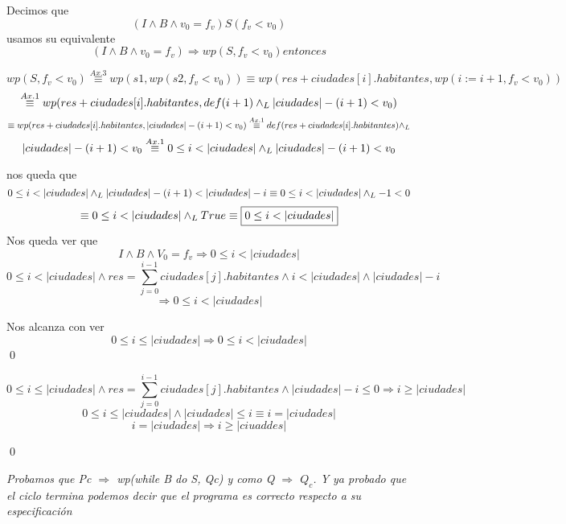 \documentclass[10pt,a4paper]{article}
\begin{document}
\begin{demoPc}
\begin{demo3}
			
			
		\end{demo3}
		
		
		
		
		\begin{demo4}
			Decimos que
			\[
			(I \land B \land v_{0}=f_{v}) S (f_{v}< v_{0})\]  usamos su equivalente \[(I \land B \land v_{0}=f_{v}) \Longrightarrow wp(S,f_{v} < v_{0}) entonces\]
			
			\[wp(S,f_{v}<v_{0}) \overset{Ax. 3}{\equiv} wp(s1,wp(s2,f_{v}<v_{0})) \equiv wp(res+ciudades[i].habitantes,wp(i:=i+1,f_{v} < v_{0})) \]
			\[\overset{Ax. 1}{\equiv} wp(res+ciudades[i].habitantes,def(i+1)\land _L |ciudades|-(i+1) < v_{0}) \]
			\[\equiv wp(res+ciudades[i].habitantes,|ciudades|-(i+1)< v_{0}) \overset{Ax. 1}{\equiv} def(res+ciudades[i].habitantes) \land _L\]
			\[|ciudades| -(i+1) < v_{0} \overset{Ax. 1}{\equiv} 0 \leq i<|ciudades| \yLuego |ciudades|-(i+1)< v_{0} \]
			
			\noindent  %
			nos queda que
			\[0 \leq i <|ciudades| \yLuego |ciudades|-(i+1) < |ciudades| - i \equiv 0 \leq i <|ciudades| \yLuego -1 < 0 \]
			\[\equiv 0 \leq i <|ciudades| \yLuego True \equiv \boxed{0 \leq i <|ciudades|}\]
			Nos queda ver que
			\[I \land B \land V_{0}=f_{v} \Longrightarrow 0 \leq i <|ciudades|\]
			\[ 0 \leq i < |ciudades| \land res= \sum_{j=0}^{i-1} ciudades[j].habitantes \land i < \lvert ciudades \rvert \land \lvert ciudades \rvert - i\]
			\[\Longrightarrow  0 \leq i < |ciudades|\]
			
			Nos alcanza con ver 
			\[ 0 \leq i \leq |ciudades| \Longrightarrow  0 \leq i < |ciudades|\]
			\qed
			
		\end{demo4}
		
		
		
		
		
		\begin{demo5}
			\[
			0 \leq i \leq \lvert ciudades\rvert \land res= \sum_{j=0}^{i-1} ciudades[j].habitantes \land |ciudades| -i\leq 0 \Longrightarrow i \geq |ciudades|
			\]
			\[
			0 \leq i \leq |ciudades| \land |ciudades| \leq i \equiv i =|ciudades| 
			\]
			\[i=|ciudades| \Longrightarrow i \geq |ciuaddes|\]
			
			
			\qed \\
			
		\end{demo5}
		\noindent \textit{\emph{Probamos que Pc $\Longrightarrow$ wp(while B do S, Qc)
				y como Q $\Longrightarrow$ $Q_{c}$. 
				Y ya probado que el ciclo termina podemos decir que el programa es correcto respecto a su especificación} }
		
	\end{demoPc}
	
\end{document}
